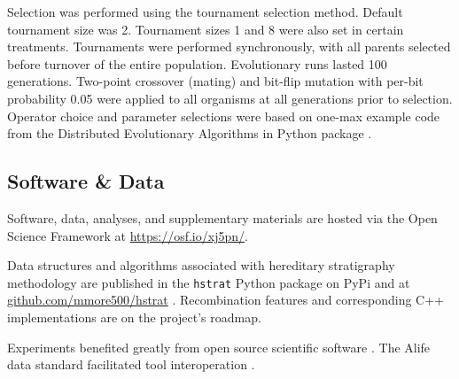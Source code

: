 Selection was performed using the tournament selection method.
Default tournament size was 2.
Tournament sizes 1 and 8 were also set in certain treatments.
Tournaments were performed synchronously, with all parents selected before turnover of the entire population.
Evolutionary runs lasted 100 generations.
Two-point crossover (mating) and bit-flip mutation with per-bit probability 0.05 were applied to all organisms at all generations prior to selection.
Operator choice and parameter selections were based on one-max example code from the Distributed Evolutionary Algorithms in Python package \citep{fortin2012deap}.







\subsection{Software \& Data}
\label{sec:software-data}

Software, data, analyses, and supplementary materials are hosted via the Open Science Framework at \url{https://osf.io/xj5pn/}.

Data structures and algorithms associated with hereditary stratigraphy methodology are published in the \texttt{hstrat} Python package on PyPi and at \url{github.com/mmore500/hstrat} \citep{moreno2022hstrat}.
Recombination features and corresponding C++ implementations are on the project's roadmap.

Experiments benefited greatly from open source scientific software \citep{cock2009biopython,fortin2012deap,sand2014tqdist}.
The Alife data standard facilitated tool interoperation \citep{lalejini2019data}.
